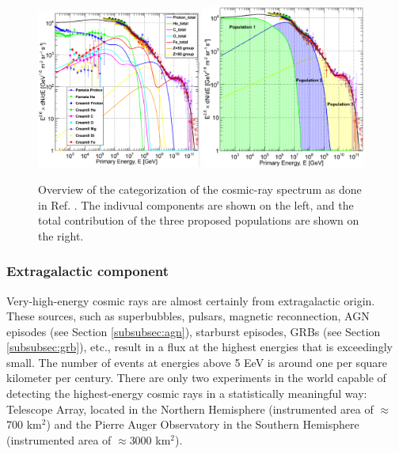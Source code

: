 \begin{figure}
\centering
\includegraphics[width=0.48\textwidth]{chapter3/img/fit1gaisser.png}
\includegraphics[width=0.48\textwidth]{chapter3/img/fit2gaisser.png}
\caption{Overview of the categorization of the cosmic-ray spectrum as done in Ref. \cite{Gaisser:2013bla}. The indivual components are shown on the left, and the total contribution of the three proposed populations are shown on the right.}
\label{fig:fitsgaisser}
\end{figure}

\subsubsection{Extragalactic component}
\label{subsec:extragalactic}
Very-high-energy cosmic rays are almost certainly from extragalactic origin. These sources, such as superbubbles, pulsars, magnetic reconnection, AGN episodes (see Section \ref{subsubsec:agn}), starburst episodes, GRBs (see Section \ref{subsubsec:grb}), etc., result in a flux at the highest energies that is exceedingly small. The number of events at energies above 5 EeV is around one per square kilometer per century. There are only two experiments in the world capable of detecting the highest-energy cosmic rays in a statistically meaningful way: Telescope Array, located in the Northern Hemisphere (instrumented area of $\approx$700 km$^2$) and the Pierre Auger Observatory in the Southern Hemisphere (instrumented area of $\approx$3000 km$^2$).

